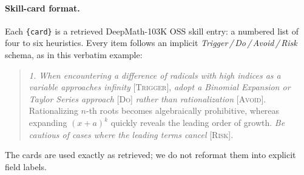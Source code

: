 \paragraph{Skill-card format.}
Each \texttt{\{card\}} is a retrieved DeepMath-103K OSS skill entry: a numbered
list of four to six heuristics. Every item follows an implicit
\emph{Trigger\,/\,Do\,/\,Avoid\,/\,Risk} schema, as in this verbatim example:
%
\begin{quote}\small
\emph{1. When encountering a difference of radicals with high indices as a
variable approaches infinity} [\textsc{Trigger}], \emph{adopt a Binomial
Expansion or Taylor Series approach} [\textsc{Do}] \emph{rather than
rationalization} [\textsc{Avoid}]. Rationalizing $n$-th roots becomes
algebraically prohibitive, whereas expanding $(x+a)^k$ quickly reveals the
leading order of growth. \emph{Be cautious of cases where the leading terms
cancel} [\textsc{Risk}].
\end{quote}
%
The cards are used exactly as retrieved; we do not reformat them into explicit
field labels.
